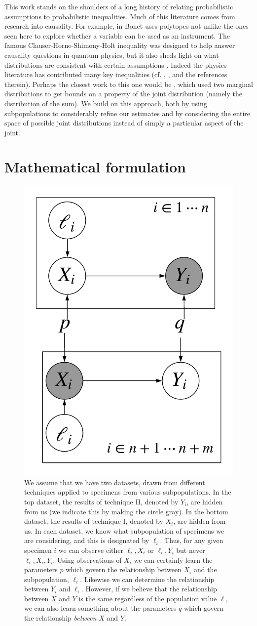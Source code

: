 This work stands on the shoulders of a long history of relating probabilistic assumptions to probabilistic inequalities.  Much of this literature comes from research into causality.  For example, in \cite{bonet2001instrumentality} Bonet uses polytopes not unlike the ones seen here to explore whether a variable can be used as an instrument.  The famous Clauser-Horne-Shimony-Holt inequality was designed to help answer causality questions in quantum physics, but it also sheds light on what distributions are consistent with certain assumptions \cite{clauser1969proposed}.  Indeed the physics literature has contributed many key inequalities (cf. \cite{chaves2014inferring}, \cite{kela2017semidefinite}, and the references therein).  Perhaps the closest work to this one would be \cite{makarov1982estimates}, which used two marginal distributions to get bounds on a property of the joint distribution (namely the distribution of the sum).  We build on this approach, both by using subpopulations to considerably refine our estimates and by considering the entire space of possible joint distributions instead of simply a particular aspect of the joint.  

\section{Mathematical formulation}

\begin{figure}
\hfill{}\includegraphics[width=.3\textwidth]{pics/plate}\hfill{}
\caption{We assume that we have two datasets, drawn from different techniques applied to specimens from various subpopulations.  In the top dataset, the results of technique II, denoted by $Y_i$, are hidden from us (we indicate this by making the circle gray).  In the bottom dataset, the results of technique I, denoted by $X_i$, are hidden from us.  In each dataset, we know what subpopulation of specimens we are considering, and this is designated by $\ell_i$.  Thus, for any given specimen $i$ we can observe either $\ell_i,X_i$ or $\ell_i,Y_i$ but never $\ell_i,X_i,Y_i$.  Using observations of $X_i$ we can certainly learn the parameters $p$ which govern the relationship between $X_i$ and the subpopulation, $\ell_i$.  Likewise we can determine the relationship between $Y_i$ and $\ell_i$.  However, if we believe that the relationship between $X$ and $Y$ is the same regardless of the population value $\ell$, we can also learn something about the parameters $q$ which govern the relationship \emph{between} $X$ and $Y$.\label{fig:plate}}
\end{figure}

